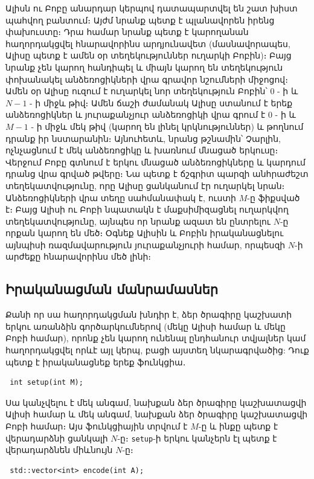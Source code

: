 \documentclass[12pt]{article}
\begin{document}
\renewcommand{\round}{Day 1}
\renewcommand{\problemName}{Task Prison}
\renewcommand{\lang}{Armenian}

\renewcommand{\tl}{$2$ sec.}
\renewcommand{\ml}{$1024$ MB}
\problem{\problemName}

Ալիսն ու Բոբը անարդար կերպով դատապարտվել են շատ խիստ պահվող  բանտում։ Այժմ նրանք պետք է պլանավորեն իրենց փախուստը։ Դրա համար նրանք պետք է կարողանան հաղորդակցվել հնարավորինս արդյունավետ (մասնավորապես, Ալիսը պետք է ամեն օր տեղեկություններ ուղարկի Բոբին)։ Բայց նրանք չեն կարող հանդիպել և միայն կարող են տեղեկություն փոխանակել անձեռոցիկների վրա գրավոր նշումների միջոցով։ Ամեն օր Ալիսը ուզում է ուղարկել նոր տեղեկություն Բոբին՝ $0$ - ի և $N-1$ - ի միջև թիվ։ Ամեն ճաշի ժամանակ Ալիսը ստանում է երեք անձեռոցիկներ և յուրաքանչյուր անձեռոցիկի վրա գրում է $0$ - ի և $M-1$ - ի միջև մեկ թիվ (կարող են լինել կրկնություններ) և թողնում դրանք իր նստարանին։ Այնուհետև, նրանց թշնամին՝ Չարլին, ոչնչացնում է մեկ անձեռոցիկը և խառնում մնացած երկուսը։ Վերջում Բոբը գտնում է երկու մնացած անձեռոցիկները և կարդում դրանց վրա գրված թվերը։ Նա պետք է ճշգրիտ պարզի անհրաժեշտ տեղեկատվությունը, որը Ալիսը ցանկանում էր ուղարկել նրան։ Անձեռոցիկների վրա տեղը սահմանափակ է, ուստի $M$-ը ֆիքսված է։ Բայց Ալիսի ու Բոբի նպատակն է մաքսիմիզացնել ուղարկվող տեղեկատվությունը, այնպես որ նրանք ազատ են ընտրելու $N$-ը որքան կարող են մեծ։ Օգնեք Ալիսին և Բոբին իրականացնելու այնպիսի ռազմավարություն յուրաքանչյուրի համար, որպեսզի $N$-ի արժեքը հնարավորինս մեծ լինի։

\subsection{Իրականացման մանրամասներ}

Քանի որ սա հաղորդակցման խնդիր է, ձեր ծրագիրը կաշխատի երկու առանձին գործարկումներով (մեկը Ալիսի համար և մեկը Բոբի համար), որոնք չեն կարող ունենալ ընդհանուր տվյալներ կամ հաղորդակցվել որևէ այլ կերպ, բացի այստեղ նկարագրվածից: Դուք պետք է իրականացնեք երեք ֆունկցիա․
\begin{lstlisting}
 int setup(int M);
\end{lstlisting}

Սա կանչվելու է մեկ անգամ, նախքան ձեր ծրագիրը կաշխատացվի Ալիսի համար և մեկ անգամ, նախքան ձեր ծրագիրը կաշխատացվի Բոբի համար։ Այս ֆունկցիային տրվում է $M$-ը և ինքը պետք է վերադարձնի ցանկալի $N$-ը։ \texttt{setup}-ի երկու կանչերն էլ պետք է վերադարձնեն միևնույն  $N$-ը։

\begin{lstlisting}
 std::vector<int> encode(int A);
\end{lstlisting}
\end{document}
